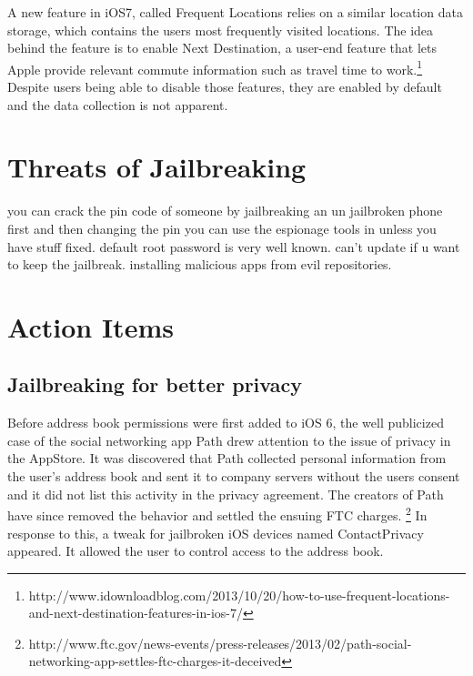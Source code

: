 \documentclass[12pt, titlepage, oneside]{article}
\begin{document}
A new feature in iOS7, called Frequent Locations relies on a similar location data storage, which contains the users most frequently visited locations. The idea behind the feature is to enable Next Destination, a user-end feature that lets Apple provide relevant commute information such as travel time to work.\footnote{http://www.idownloadblog.com/2013/10/20/how-to-use-frequent-locations-and-next-destination-features-in-ios-7/} Despite users being able to disable those features, they are enabled by default and the data collection is not apparent.

\section{Threats of Jailbreaking}

you can crack the pin code of someone by jailbreaking an un jailbroken phone first and then changing the pin
you can use the espionage tools in \cite{espionage} unless you have stuff fixed.
default root password is very well known.
can't update if u want to keep the jailbreak.
installing malicious apps from evil repositories.

\section{Action Items}
\subsection{Jailbreaking for better privacy}

Before address book permissions were first added to iOS 6, the well publicized case of the social networking app Path drew attention to the issue of privacy in the AppStore. It was discovered that Path collected personal information from the user's address book and sent it to company servers without the users consent and it did not list this activity in the privacy agreement. The creators of Path have since removed the behavior and settled the ensuing FTC charges. \footnote{http://www.ftc.gov/news-events/press-releases/2013/02/path-social-networking-app-settles-ftc-charges-it-deceived} In response to this, a tweak for jailbroken iOS devices named ContactPrivacy appeared. It allowed the user to control access to the address book.
\end{document}
